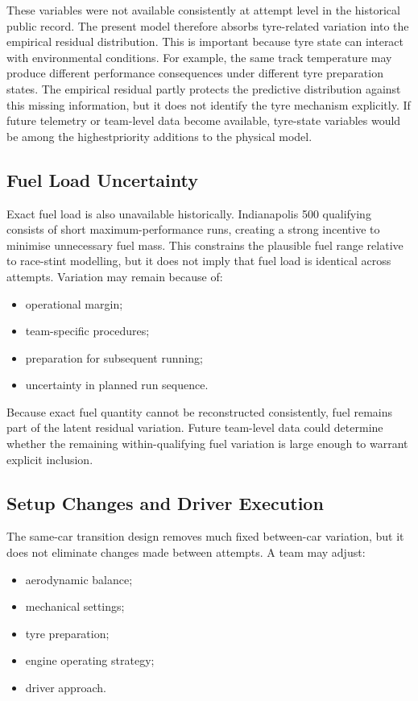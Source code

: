 These variables were not available consistently at attempt level in the historical public record. The present model therefore absorbs tyre-related variation into the empirical residual distribution. This is important because tyre state can interact with environmental conditions. For example, the same track temperature may produce different performance consequences under different tyre preparation states. The empirical residual partly protects the predictive distribution against this missing information, but it does not identify the tyre mechanism explicitly. If future telemetry or team-level data become available, tyre-state variables would be among the highestpriority additions to the physical model.

\subsection{Fuel Load Uncertainty}
Exact fuel load is also unavailable historically. Indianapolis 500 qualifying consists of short maximum-performance runs, creating a strong incentive to minimise unnecessary fuel mass. This constrains the plausible fuel range relative to race-stint modelling, but it does not imply that fuel load is identical across attempts. Variation may remain because of:

\begin{itemize}
\item operational margin;
\item team-specific procedures;
\item preparation for subsequent running;
\item uncertainty in planned run sequence.
\end{itemize}

Because exact fuel quantity cannot be reconstructed consistently, fuel remains part of the latent residual variation. Future team-level data could determine whether the remaining within-qualifying fuel variation is large enough to warrant explicit inclusion.

\subsection{Setup Changes and Driver Execution}
The same-car transition design removes much fixed between-car variation, but it does not eliminate changes made between attempts. A team may adjust:

\begin{itemize}
\item aerodynamic balance;
\item mechanical settings;
\item tyre preparation;
\item engine operating strategy;
\item driver approach.
\end{itemize}


